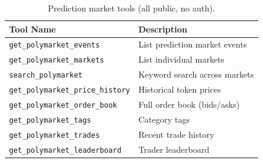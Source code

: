 \begin{longtable}{p{5.5cm}p{7.5cm}}
\caption{Prediction market tools (all public, no auth).} \label{tab:tools-polymarket} \\
\toprule
\textbf{Tool Name} & \textbf{Description} \\
\midrule
\endfirsthead
\texttt{get\_polymarket\_events} & List prediction market events \\
\texttt{get\_polymarket\_markets} & List individual markets \\
\texttt{search\_polymarket} & Keyword search across markets \\
\texttt{get\_polymarket\_price\_history} & Historical token prices \\
\texttt{get\_polymarket\_order\_book} & Full order book (bids/asks) \\
\texttt{get\_polymarket\_tags} & Category tags \\
\texttt{get\_polymarket\_trades} & Recent trade history \\
\texttt{get\_polymarket\_leaderboard} & Trader leaderboard \\
\bottomrule
\end{longtable}
